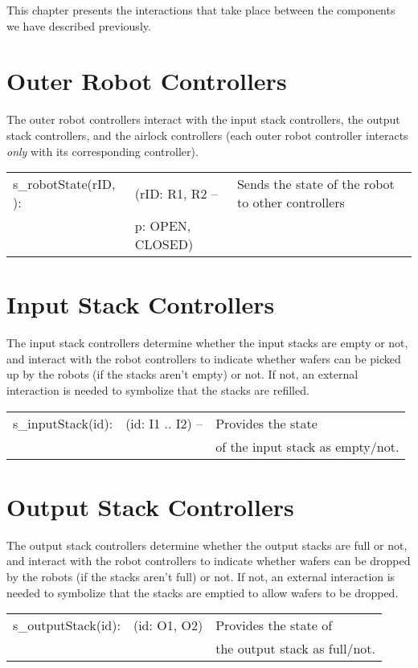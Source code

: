 
This chapter presents the interactions that take place between the components we have described previously.

\section{Outer Robot Controllers}

The outer robot controllers interact with the input stack controllers, the output stack controllers, and the airlock controllers (each outer robot controller interacts \textit{only} with its corresponding controller).

\begin{tabular}{ l l l }
  s_robotState(rID, ): & (rID: R1, R2 --  & Sends the state of the robot to other controllers \\
  &  p: OPEN, CLOSED) & \\
\end{tabular}

\section{Input Stack Controllers}

The input stack controllers determine whether the input stacks are empty or not, and interact with the robot controllers to indicate whether wafers can be picked up by the robots (if the stacks aren't empty) or not. If not, an external interaction is needed to symbolize that the stacks are refilled. 

\begin{tabular}{ l l l }
  s_inputStack(id): & (id: I1 .. I2) -- & Provides the state \\
  &  & of the input stack as empty/not. \\
\end{tabular}

\section{Output Stack Controllers}

The output stack controllers determine whether the output stacks are full or not, and interact with the robot controllers to indicate whether wafers can be dropped by the robots (if the stacks aren't full) or not. If not, an external interaction is needed to symbolize that the stacks are emptied to allow wafers to be dropped. 

\begin{tabular}{ l l l }
  s_outputStack(id): & (id: O1, O2) & Provides the state of  \\
  & & the output stack as full/not. \\
\end{tabular}

